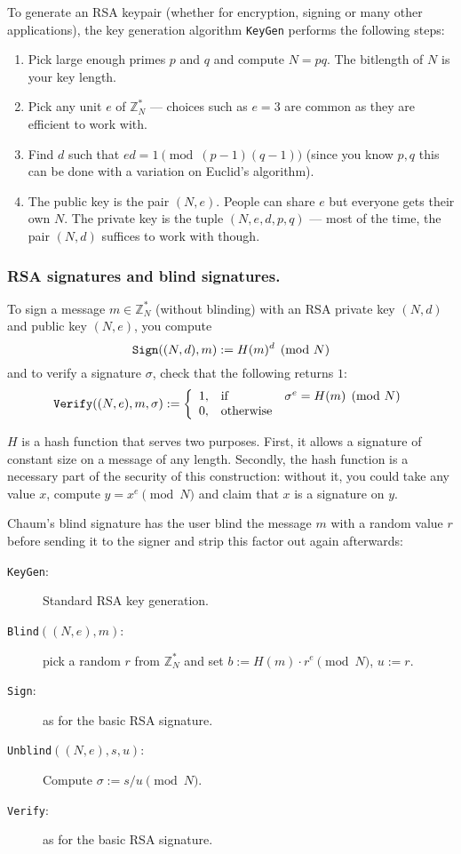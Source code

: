 \documentclass[envcountsame]{llncs}
\newcommand{\alg}[1]{\textup{\texttt{#1}}}
\newenvironment{maths}{\begin{framed}
\vspace{-12pt}
\begin{wrapfigure}{l}{0.15\textwidth}
\vspace{-12pt}\quad{\Huge $\sum$}
\end{wrapfigure}}{\end{framed}}
\begin{document}
\begin{maths}
To generate an RSA keypair (whether for encryption, signing or many other
applications), the key generation algorithm \alg{KeyGen} performs the following
steps:
\begin{enumerate}
\item Pick large enough primes $p$ and $q$ and compute $N = pq$. The bitlength
of $N$ is your key length.
\item Pick any unit $e$ of $\mathbb Z^*_N$ --- choices such as $e = 3$ are
common as they are efficient to work with.
\item Find $d$ such that $ed = 1 \pmod{(p-1)(q-1)}$ (since you know $p, q$ this
can be done with a variation on Euclid's algorithm).
\item The public key is the pair $(N, e)$. People can share $e$ but everyone
gets their own $N$. The private key is the tuple $(N, e, d, p, q)$ --- most of
the time, the pair $(N, d)$ suffices to work with though.
\end{enumerate}
\end{maths}

\subsubsection{RSA signatures and blind signatures.}
To sign a message $m \in \mathbb Z^*_N$ (without blinding) with an RSA private
key $(N, d)$ and public key $(N, e)$, you compute
\[
\alg{Sign}((N, d), m) := H(m)^d \pmod{N}
\]
and to verify a signature $\sigma$, check that the following returns $1$:
\[
\alg{Verify}((N, e), m, \sigma) :=
\left\{ \begin{array}{lll}
1, & \textrm{if} & \sigma^e = H(m) \pmod{N} \\
0, & \textrm{otherwise} & \\
\end{array} \right.
\]

$H$ is a hash function that serves two purposes. First, it allows a signature of
constant size on a message of any length. Secondly, the hash function is a
necessary part of the security of this construction: without it, you could take
any value $x$, compute $y = x^e \pmod{N}$ and claim that $x$ is a signature on
$y$.

Chaum's blind signature has the user blind the message $m$ with a random value
$r$ before sending it to the signer and strip this factor out again afterwards:

\begin{description}
\item[\alg{KeyGen}:] Standard RSA key generation.
\item[\alg{Blind}$((N, e), m)$:] pick a random $r$ from $\mathbb Z^*_N$ and set
$b := H(m) \cdot r^e \pmod{N}$, $u := r$.
\item[\alg{Sign}:] as for the basic RSA signature.
\item[\alg{Unblind}$((N, e), s, u)$:] Compute $\sigma := s/u \pmod{N}$.
\item[\alg{Verify}:] as for the basic RSA signature.
\end{description}
\end{document}
